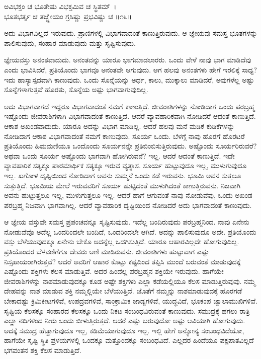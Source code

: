 \begin{shloka}
ಅವಿಭಕ್ತಂ ಚ ಭೂತೇಷು ವಿಭಕ್ತಮಿವ ಚ ಸ್ಥಿತಮ್~।\\ಭೂತಭರ್ತೃ ಚ ತಜ್ಜ್ಞೇಯಂ ಗ್ರಸಿಷ್ಣು ಪ್ರಭವಿಷ್ಣು ಚ \hfill॥೧೬॥
\end{shloka}

\begin{artha}
ಅದು ವಿಭಾಗವಿಲ್ಲದೆ ಇರುವುದು. ಪ್ರಾಣಿಗಳಲ್ಲಿ ವಿಭಾಗವಾದಂತೆ ಕಾಣುತ್ತಿರುವುದು. ಆ ಜ್ಞೇಯವು ಸಮಸ್ತ ಭೂತಗಳನ್ನು ಪಾಲಿಸುವುದು, ಸಂಹಾರ ಮಾಡುವುದು ಮತ್ತು ಸೃಷ್ಟಿಸುವುದು.
\end{artha}

ಜ್ಞೇಯವಸ್ತು ಅನಂತವಾದುದು. ಅನಂತವನ್ನು ಯಾರೂ ಭಾಗಮಾಡಲಾರರು. ಒಂದು ವೇಳೆ ನಾವು ಭಾಗ ಮಾಡಿದೆವು ಎಂದು ಭಾವಿಸಿದರೆ, ಪ್ರತಿಯೊಂದು ಭಾಗವೂ ಅನಂತವೇ ಆಗುವುದು. ಆಗ ಹಲವು ಅನಂತಗಳು ಹೇಗೆ ಇರಲಿಕ್ಕೆ ಸಾಧ್ಯ? ಇದು ಹಾಸ್ಯಾಸ್ಪದವಾಗಿ ಕಾಣುವುದು. ಒಂದು ಸೊನ್ನೆಯನ್ನು ಅರ್ಧ, ಕಾಲು, ಮುಕ್ಕಾಲು ಮಾಡಿದರೆ, ಅವುಗಳೆಲ್ಲ ಅಷ್ಟು ಸೊನ್ನೆಗಳಾಗುತ್ತವೆ ಹೊರತು, ಸೊನ್ನೆಯ ಅಷ್ಟು ಭಾಗವಾಗುವುದಿಲ್ಲ.

ಅದು ವಿಭಾಗವಾಗದೆ ಇದ್ದರೂ ವಿಭಾಗವಾದಂತೆ ನಮಗೆ ಕಾಣುತ್ತಿದೆ. ಜೀವರಾಶಿಗಳನ್ನು ನೋಡಿದಾಗ ಒಂದು ಪರಬ್ರಹ್ಮ ಇಷ್ಟೊಂದು ಜೀವರಾಶಿಗಳಾಗಿ ವಿಭಾಗವಾದಂತೆ ಕಾಣುತ್ತಿದೆ. ಆದರೆ ವ್ಯಾವಹಾರಿಕವಾಗಿ ನೋಡಿದರೆ ಆದಂತೆ ಕಾಣುತ್ತಿದೆ. ಆಕಾಶ ಅಖಂಡವಾದುದು. ಯಾರೂ ಅದನ್ನು ವಿಭಾಗ ಮಾಡಿಲ್ಲ. ಆದರೆ ಹಲವು ಮನೆ ಮಡಿಕೆ ಕುಡಿಕೆಗಳನ್ನು ನೋಡಿದಾಗ ಆಕಾಶ ವಿಭಾಗವಾದಂತೆ ನಮಗೆ ಕಾಣುವುದು. ಸೂರ್ಯ ಒಂದು. ಬೆಳಗ್ಗೆ ನಾವು ಹೊರಗೆ ಹೊರಟರೆ ಪ್ರತಿಯೊಂದು ಹಿಮಮಣಿಯೂ ಒಂದೊಂದು ಸೂರ್ಯನನ್ನೇ ಪ್ರತಿಬಿಂಬಿಸುತ್ತಿರುವುದು. ಅಷ್ಟೊಂದು ಸೂರ್ಯರಿರುವರೆ? ಅಥವಾ ಒಂದು ಸೂರ್ಯ ಅಷ್ಟೊಂದು ಭಾಗವಾಗಿ ಹೋಗಿರುವನೆ? ಇಲ್ಲ. ಆದರೆ ಆದಂತೆ ಕಾಣುತ್ತಿದೆ. ಇದೇ ವ್ಯಾವಹಾರಿಕ ಸತ್ಯಕ್ಕೂ ಪಾರಮಾರ್ಥಿಕ ಸತ್ಯಕ್ಕೂ ಇರುವ ವ್ಯತ್ಯಾಸ. ಸೂರ್ಯ ಹುಟ್ಟುವುದೂ ಇಲ್ಲ, ಮುಳುಗುವುದೂ ಇಲ್ಲ. ಖಗೋಳ ದೃಷ್ಟಿಯಿಂದ ನೋಡಿದಾಗ ಅವನು ಸುಮ್ಮನೆ ಒಂದು ಕಡೆ ಇರುವನು. ಭೂಮಿ ಅವನ ಸುತ್ತಲೂ ಸುತ್ತುತ್ತಿದೆ. ಭೂಮಿಯ ಮೇಲೆ ಇರುವವರಿಗೆ ಸೂರ್ಯ ಹುಟ್ಟಿದಂತೆ ಮುಳುಗಿದಂತೆ ಕಾಣುತ್ತಿರುವನು. ನಿಜವಾಗಿ ಅವನು ಹುಟ್ಟುತ್ತಲೂ ಇಲ್ಲ, ಮುಳುಗುತ್ತಲೂ ಇಲ್ಲ. ಆದರೆ ಹಾಗೆ ಆಗುವಂತೆ ನಾವು ನೋಡುವೆವು, ಒಂದು ಅಖಂಡ ಪರಬ್ರಹ್ಮ ನಿಜವಾಗಿ ಭಾಗವಾಗಿಲ್ಲ. ಆದರೆ ವ್ಯಾವಹಾರಿಕ ದೃಷ್ಟಿಯಿಂದ ನೋಡಿದರೆ ಅದು ಭಾಗವಾದಂತೆ ಕಾಣುವುದು.

ಆ ಜ್ಞೇಯ ವಸ್ತುವೇ ಸಮಸ್ತ ಪ್ರಪಂಚವನ್ನೂ ಸೃಷ್ಟಿಸುವುದು. ಇದೆಲ್ಲ ಬಂದಿರುವುದು ಪರಬ್ರಹ್ಮನಿಂದ. ನಾವು ಏನೇನು ನೋಡುವೆವೊ ಅದೆಲ್ಲ ಒಂದರಿಂದಲೇ ಬಂದಿದೆ, ಒಂದರಿಂದಲೇ ಆಗಿದೆ. ಅದನ್ನು ಪಾಲಿಸುವುದೂ ಅದೇ. ಪ್ರತಿಯೊಂದು ವಸ್ತು ಬೆಳೆಯುವುದಕ್ಕೂ ಏನೇನು ಬೇಕೊ ಅದನ್ನೆಲ್ಲ ಒದಗಿಸುತ್ತಿದೆ. ಯಾರೂ ಆಹಾರವಿಲ್ಲದೇ ಹೋಗುವುದಿಲ್ಲ. ಪ್ರತಿಯೊಂದರ ಬೆಳವಣಿಗೆಗೂ ದೇವರು ಅಣಿ ಮಾಡಿರುವನು. ಜೀವರಾಶಿಗಳು ಹುಟ್ಟುವಾಗ ಎಷ್ಟು ನಿಸ್ಸಹಾಯ\-ರಾಗಿರುತ್ತವೆ? ಆದರೆ ಅವರಿಗೆ ಆಹಾರ ಕೊಟ್ಟು ಕಷ್ಟದಿಂದ ತಪ್ಪಿಸಿ ಮುಂದೆ ಬರುವಂತೆ ಮಾಡುವುದಕ್ಕೆ ಎಷ್ಟೊಂದು ಶಕ್ತಿಗಳು ಕೆಲಸ ಮಾಡುತ್ತಿವೆ. ಅದರ ಹಿಂದೆಲ್ಲ ಪರಬ್ರಹ್ಮನ ಶಕ್ತಿಯೇ ಇರುವುದು. ಹಾಗೆಯೇ ಜೀವರಾಶಿಗಳನ್ನು ನಾಶಮಾಡುವುದಕ್ಕೂ ಕೂಡ ಅಷ್ಟೇ ಶಕ್ತಿಗಳು ಎಲ್ಲಾ ಕಡೆಯಲ್ಲಿಯೂ ಕೆಲಸ ಮಾಡುತ್ತಿರುವುವು. ನಮ್ಮ ದೇಹವನ್ನು ನಾಶ ಮಾಡುವ ಶಕ್ತಿ ನಮ್ಮಲ್ಲಿಯೇ ಬೆಳೆಯುತ್ತಿದೆ. ಜೊತೆಗೆ ನಮ್ಮನ್ನು ನಾಶಮಾಡುವುದಕ್ಕೆ ಹೊರಗಡೆ ಬೇಕಾದಷ್ಟು ಕ್ರಿಮಿಕೀಟಗಳಿವೆ, ಉಪದ್ರವಗಳಿವೆ, ಸಾಂಕ್ರಾಮಿಕ ಜಾಡ್ಯಗಳಿವೆ, ಯುದ್ಧವಿದೆ, ಭೂಕಂಪ ಜ್ವಾಲಾಮುಖಿಗಳಿವೆ. ಸೃಷ್ಟಿಯ ಕೆಲಸಕ್ಕೂ ಸಂಹಾರದ ಕೆಲಸಕ್ಕೂ ಒಂದು ನಿಕಟ ಸಂಬಂಧವಿರುವಂತೆ ಕಾಣುವುದು. ಸಮುದ್ರಕ್ಕೆ ಹಗಲು ರಾತ್ರಿ ಎಲ್ಲಾ ನದಿಗಳಿಂದ ನೀರು ಬಂದು ಬೀಳುತ್ತಿರುತ್ತದೆ. ಆದರೆ ಎಷ್ಟು ಬರುವುದೋ ಅಷ್ಟು ಆವಿಯಾಗಿ ಹೋಗುವುದು. ಅದಕ್ಕೆ ಸಮುದ್ರ ಹೆಚ್ಚಾಗುವುದೂ ಇಲ್ಲ, ಕಡಿಮೆಯಾಗುವುದೂ ಇಲ್ಲ. ಇಲ್ಲಿ ಹೇಗೆ ಅನ್ಯೋನ್ಯ ಸಂಬಂಧವಿದೆಯೋ, ಹಾಗೆಯೇ ಸೃಷ್ಟಿ ಸ್ಥಿತಿ ಪ್ರಳಯಗಳಲ್ಲಿ ಒಂದಕ್ಕೂ ಮತ್ತೊಂದಕ್ಕೂ ಸಂಬಂಧವಿದೆ. ಎಲ್ಲದರ ಹಿಂದೆಯೂ ಪಕ್ಷಪಾತವಿಲ್ಲದೆ ಭಗವಂತನ ಶಕ್ತಿ ಕೆಲಸ ಮಾಡುತ್ತಿದೆ.

